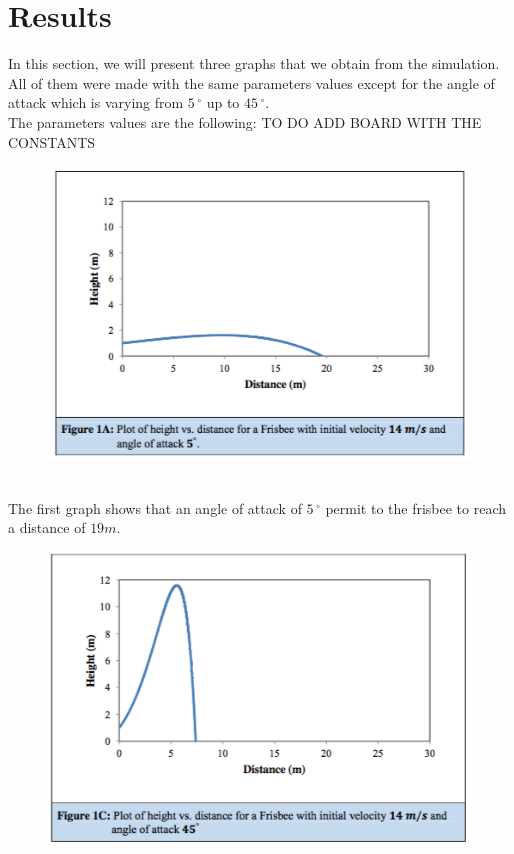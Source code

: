 \documentclass[10pt,a4paper]{report}
\begin{document}
\section{Results}
In this section, we will present three graphs that we obtain from the simulation. All of them were made with the same parameters values except for the angle of attack which is varying from $5\,^{\circ}$ up to $45\,^{\circ} $. 
\\The parameters values are the following:
TO DO ADD BOARD WITH THE CONSTANTS
\begin{figure}[h]
 \centering
\includegraphics[scale=0.6]{graph1.jpg}
\end{figure}
\\The first graph shows that an angle of attack of $5\,^{\circ}$ permit to the frisbee to reach a distance of $19m$.
\begin{figure}[h]
\centering
\includegraphics[scale=0.6]{graph3.jpg}
\end{figure}
\end{document}
